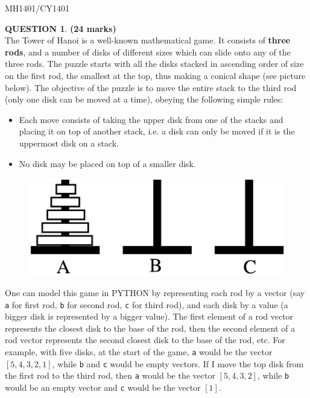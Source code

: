 \documentclass[a4paper,12pt]{article}
\theoremstyle{definition}
\newtheorem{ques}[dummy]{QUESTION}
\theoremstyle{plain}
\newcommand{\ttx}[1]{\texttt{#1}}
\begin{document}
\newpage

\hfill MH1401/CY1401\vspace*{0.5em}

\begin{ques}\hfill \textbf{(24 marks)}\vspace*{2em}\\
	The Tower of Hanoi is a well-known mathematical game. It consists of \textbf{three rods}, and a number of disks of different sizes which can slide onto any of the three rods. The puzzle starts with all the disks stacked in ascending order of size on the first rod, the smallest at the top, thus making a conical shape (see picture below). The objective of the puzzle is to move the entire stack to the third rod (only one disk can be moved at a time), obeying the following simple rules:
	\begin{itemize}
		\item Each move consists of taking the upper disk from one of the stacks and placing it on top of another stack, i.e. a disk can only be moved if it is the uppermost disk on a stack.
		
		\item No disk may be placed on top of a smaller disk.
	\end{itemize}
	
	\begin{figure}[H]
		\centering
		\includegraphics[scale=0.3]{TowersOfHanoiFigure.jpg}
	\end{figure}
	
	One can model this game in PYTHON by representing each rod by a vector (say \ttx{a} for first rod, \ttx{b} for second rod, \ttx{c} for third rod), and each disk by a value (a bigger disk is represented by a bigger value). The first element of a rod vector represents the closest disk to the base of the rod, then the second element of a rod vector represents the second closest disk to the base of the rod, etc. For example, with five disks, at the start of the game, \ttx{a} would be the vector $[5, 4, 3, 2, 1]$, while \ttx{b} and \ttx{c} would be empty vectors. If I move the top disk from the first rod to the third rod, then \ttx{a} would be the vector $[5,4,3,2]$, while \ttx{b} would be an empty vector and \ttx{c} would be the vector $[1]$.\vspace*{1em}
	

\end{ques}
\end{document}
